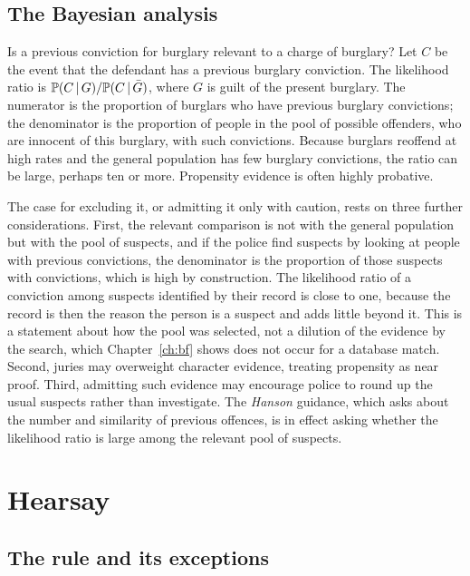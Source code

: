 \subsection{The Bayesian analysis}

Is a previous conviction for burglary relevant to a charge of burglary? Let $C$ be the event that the defendant has a previous burglary conviction. The likelihood ratio is $\mathbb{P}(C\,\vert\, G)/\mathbb{P}(C\,\vert\,\bar G)$, where $G$ is guilt of the present burglary. The numerator is the proportion of burglars who have previous burglary convictions; the denominator is the proportion of people in the pool of possible offenders, who are innocent of this burglary, with such convictions. Because burglars reoffend at high rates and the general population has few burglary convictions, the ratio can be large, perhaps ten or more. Propensity evidence is often highly probative.

The case for excluding it, or admitting it only with caution, rests on three further considerations. First, the relevant comparison is not with the general population but with the pool of suspects, and if the police find suspects by looking at people with previous convictions, the denominator is the proportion of those suspects with convictions, which is high by construction. The likelihood ratio of a conviction among suspects identified by their record is close to one, because the record is then the reason the person is a suspect and adds little beyond it. This is a statement about how the pool was selected, not a dilution of the evidence by the search, which Chapter~\ref{ch:bf} shows does not occur for a database match. Second, juries may overweight character evidence, treating propensity as near proof. Third, admitting such evidence may encourage police to round up the usual suspects rather than investigate. The \emph{Hanson} guidance, which asks about the number and similarity of previous offences, is in effect asking whether the likelihood ratio is large among the relevant pool of suspects.

\section{Hearsay}

\subsection{The rule and its exceptions}

